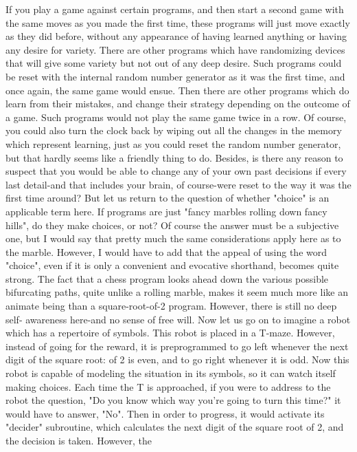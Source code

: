 If you play a game against certain programs, and then start a second game with the same
moves as you made the first time, these programs will just move exactly as they did
before, without any appearance of having learned anything or having any desire for
variety. There are other programs which have randomizing devices that will give some
variety but not out of any deep desire. Such programs could be reset with the internal
random number generator as it was the first time, and once again, the same game would
ensue. Then there are other programs which do learn from their mistakes, and change
their strategy depending on the outcome of a game. Such programs would not play the
same game twice in a row. Of course, you could also turn the clock back by wiping out
all the changes in the memory which represent learning, just as you could reset the
random number generator, but that hardly seems like a friendly thing to do. Besides, is
there any reason to suspect that you would be able to change any of your own past
decisions if every last detail-and that includes your brain, of course-were reset to the way
it was the first time around?
         But let us return to the question of whether "choice" is an applicable term here. If
programs are just "fancy marbles rolling down fancy hills", do they make choices, or not?
Of course the answer must be a subjective one, but I would say that pretty much the same
considerations apply here as to the marble. However, I would have to add that the appeal
of using the word "choice", even if it is only a convenient and evocative shorthand,
becomes quite strong. The fact that a chess program looks ahead down the various
possible bifurcating paths, quite unlike a rolling marble, makes it seem much more like
an animate being than a square-root-of-2 program. However, there is still no deep self-
awareness here-and no sense of free will.
         Now let us go on to imagine a robot which has a repertoire of symbols. This robot
is placed in a T-maze. However, instead of going for the reward, it is preprogrammed to
go left whenever the next digit of the square root: of 2 is even, and to go right whenever it
is odd. Now this robot is capable of modeling the situation in its symbols, so it can watch
itself making choices. Each time the T is approached, if you were to address to the robot
the question, "Do you know which way you're going to turn this time?" it would have to
answer, "No". Then in order to progress, it would activate its "decider" subroutine, which
calculates the next digit of the square root of 2, and the decision is taken. However, the
